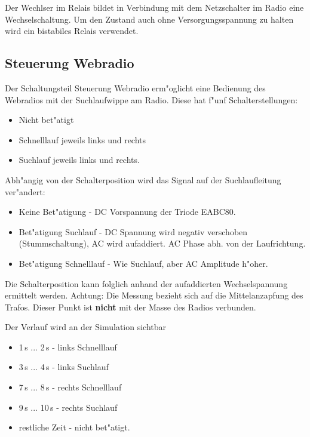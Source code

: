 \documentclass[ngerman,11pt,parskip=half] {scrartcl}
\begin{document}
Der Wechlser im Relais bildet in Verbindung mit dem Netzschalter im Radio eine Wechselschaltung. Um den Zustand auch ohne Versorgungsspannung zu halten wird ein bistabiles Relais verwendet.

\subsection{Steuerung Webradio} \label{sec:schaltung:steuern-web}

Der Schaltungsteil Steuerung Webradio erm"oglicht eine Bedienung des Webradios mit der Suchlaufwippe am Radio. Diese hat f"unf Schalterstellungen:
\begin{itemize}
\item Nicht bet"atigt
\item Schnelllauf jeweils links und rechts
\item Suchlauf jeweils links und rechts.
\end{itemize}
Abh"angig von der Schalterposition wird das Signal auf der Suchlaufleitung ver"andert:
\begin{itemize}
\item Keine Bet"atigung - DC Vorspannung der Triode EABC80.
\item Bet"atigung Suchlauf - DC Spannung wird negativ verschoben (Stummschaltung), AC wird aufaddiert. AC Phase abh. von der Laufrichtung.
\item Bet"atigung Schnelllauf - Wie Suchlauf, aber AC Amplitude h"oher.
\end{itemize}

Die Schalterposition kann folglich anhand der aufaddierten Wechselspannung ermittelt werden. Achtung: Die Messung bezieht sich auf die Mittelanzapfung des Trafos. Dieser Punkt ist \textbf{nicht} mit der Masse des Radios verbunden.


Der Verlauf wird an der Simulation sichtbar
\begin{itemize}
\item 1\,s ... 2\,s - links Schnelllauf
\item 3\,s ... 4\,s - links Suchlauf
\item 7\,s ... 8\,s - rechts Schnelllauf
\item 9\,s ... 10\,s - rechts Suchlauf
\item restliche Zeit - nicht bet"atigt.
\end{itemize}
\end{document}
